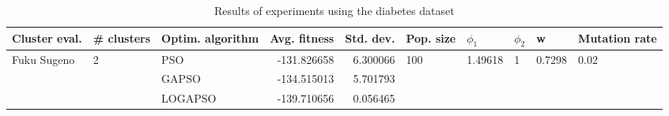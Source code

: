 \begin{table}
\centering
\caption{Results of experiments using the diabetes dataset}
\begin{tabular}{lllrrlllll}
\toprule
               Cluster eval. &        \# clusters & Optim. algorithm &  Avg. fitness &  Std. dev. &            Pop. size &               $\phi_{1}$ &         $\phi_{2}$ &                       w &         Mutation rate \\
\midrule
\multirow{3}{*}{Fuku Sugeno} & \multirow{3}{*}{2} &              PSO &   -131.826658 &   6.300066 & \multirow{3}{*}{100} & \multirow{3}{*}{1.49618} & \multirow{3}{*}{1} & \multirow{3}{*}{0.7298} & \multirow{3}{*}{0.02} \\
                             &                    &            GAPSO &   -134.515013 &   5.701793 &                      &                          &                    &                         &                       \\
                             &                    &          LOGAPSO &   -139.710656 &   0.056465 &                      &                          &                    &                         &                       \\
\bottomrule
\end{tabular}
\end{table}
